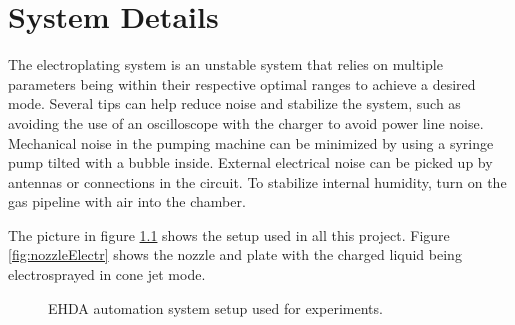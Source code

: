 \chapter{System Details}


The electroplating system is an unstable system that relies on multiple parameters being within their respective optimal ranges to achieve a desired mode. 
Several tips can help reduce noise and stabilize the system, such as avoiding the use of an oscilloscope with the charger to avoid power line noise. 
Mechanical noise in the pumping machine can be minimized by using a syringe pump tilted with a bubble inside. 
External electrical noise can be picked up by antennas or connections in the circuit. 
To stabilize internal humidity, turn on the gas pipeline with air into the chamber.

The picture in figure \ref{fig:setup_pic} shows the setup used in all this project. Figure \ref{fig:nozzleElectr} shows the nozzle and plate with the charged liquid being electrosprayed in cone jet mode.

\begin{figure}[H]
  \centering
  \caption{EHDA automation system setup used for experiments.}
  \label{fig:setup_pic}
\end{figure}

